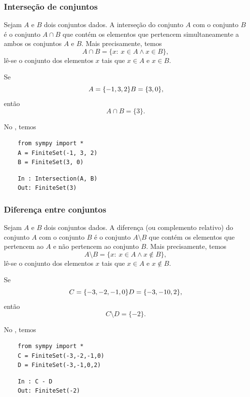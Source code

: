 \subsubsection{Interseção de conjuntos}

Sejam $A$ e $B$ dois conjuntos dados. A interseção do conjunto $A$ com o conjunto $B$ é o conjunto $A\cap B$ que contém os elementos que pertencem simultaneamente a ambos os conjuntos $A$ e $B$. Mais precisamente, temos
\begin{equation}
  A\cap B = \{x:~x\in A \land x\in B\},
\end{equation}
lê-se o conjunto dos elementos $x$ tais que $x\in A$ e $x\in B$.

\begin{ex}
  Se
  \begin{equation}
    A = \{-1, 3, 2\}\\
    B = \{3, 0\},
  \end{equation}
  então
  \begin{equation}
    A\cap B = \{3\}.
  \end{equation}

  \ifispython
  No \python, temos
  \begin{lstlisting}
    from sympy import *
    A = FiniteSet(-1, 3, 2)
    B = FiniteSet(3, 0)
  \end{lstlisting}
  \begin{lstlisting}
    In : Intersection(A, B)
    Out: FiniteSet(3)
  \end{lstlisting}
  \fi
\end{ex}

\subsubsection{Diferença entre conjuntos}

Sejam $A$ e $B$ dois conjuntos dados. A diferença (ou complemento relativo) do conjunto $A$ com o conjunto $B$ é o conjunto $A\setminus B$ que contém os elementos que pertencem ao $A$ e não pertencem ao conjunto $B$. Mais precisamente, temos
\begin{equation}
  A\setminus B = \{x:~x\in A \land x\not\in B\},
\end{equation}
lê-se o conjunto dos elementos $x$ tais que $x\in A$ e $x\not\in B$.

\begin{ex}
  Se
  \begin{equation}
    C = \{-3, -2, -1, 0\}\\
    D = \{-3, -1 0, 2\},
  \end{equation}
  então
  \begin{equation}
    C\setminus D = \{-2\}.
  \end{equation}

  \ifispython
  No \python, temos
  \begin{lstlisting}
    from sympy import *
    C = FiniteSet(-3,-2,-1,0)
    D = FiniteSet(-3,-1,0,2)
  \end{lstlisting}
  \begin{lstlisting}
    In : C - D
    Out: FiniteSet(-2)
  \end{lstlisting}
  \fi
\end{ex}

